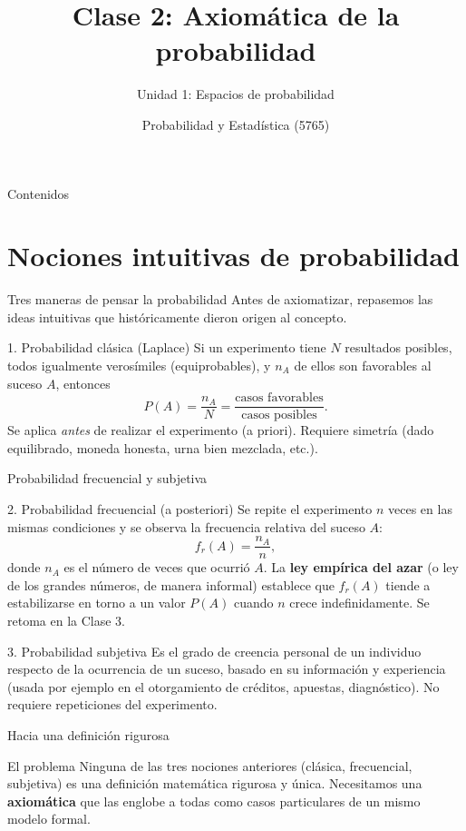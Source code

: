 \documentclass[aspectratio=169,11pt]{beamer}
\title[Prob. y Estadística]{Clase 2: Axiomática de la probabilidad}
\subtitle{Unidad 1: Espacios de probabilidad}
\institute[UNS]{Universidad Nacional del Sur \\ Departamento de Matemática}
\author{Probabilidad y Estadística (5765)}
\date{}
\begin{document}
\begin{frame}
\titlepage
\end{frame}

\begin{frame}{Contenidos}
\tableofcontents
\end{frame}

\section{Nociones intuitivas de probabilidad}

\begin{frame}{Tres maneras de pensar la probabilidad}
Antes de axiomatizar, repasemos las ideas intuitivas que históricamente dieron origen al concepto.

\begin{block}{1. Probabilidad clásica (Laplace)}
Si un experimento tiene $N$ resultados posibles, todos igualmente verosímiles (equiprobables), y $n_A$ de ellos son favorables al suceso $A$, entonces
\[
P(A) = \frac{n_A}{N} = \frac{\text{casos favorables}}{\text{casos posibles}}.
\]
Se aplica \emph{antes} de realizar el experimento (a priori). Requiere simetría (dado equilibrado, moneda honesta, urna bien mezclada, etc.).
\end{block}
\end{frame}

\begin{frame}{Probabilidad frecuencial y subjetiva}
\begin{block}{2. Probabilidad frecuencial (a posteriori)}
Se repite el experimento $n$ veces en las mismas condiciones y se observa la frecuencia relativa del suceso $A$:
\[
f_r(A) = \frac{n_A}{n},
\]
donde $n_A$ es el número de veces que ocurrió $A$. La \textbf{ley empírica del azar} (o ley de los grandes números, de manera informal) establece que $f_r(A)$ tiende a estabilizarse en torno a un valor $P(A)$ cuando $n$ crece indefinidamente. Se retoma en la Clase 3.
\end{block}
\begin{block}{3. Probabilidad subjetiva}
Es el grado de creencia personal de un individuo respecto de la ocurrencia de un suceso, basado en su información y experiencia (usada por ejemplo en el otorgamiento de créditos, apuestas, diagnóstico). No requiere repeticiones del experimento.
\end{block}
\end{frame}

\begin{frame}{Hacia una definición rigurosa}
\begin{alertblock}{El problema}
Ninguna de las tres nociones anteriores (clásica, frecuencial, subjetiva) es una definición matemática rigurosa y única. Necesitamos una \textbf{axiomática} que las englobe a todas como casos particulares de un mismo modelo formal.
\end{alertblock}
\end{frame}
\end{document}
